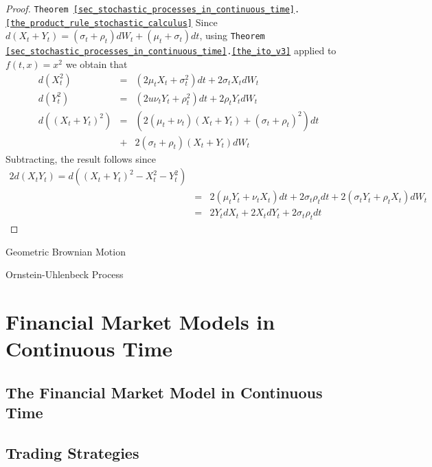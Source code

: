 \documentclass[11pt,a4paper]{article}
\begin{document}
  \begin{proof}{\texttt{Theorem \ref{sec_stochastic_processes_in_continuous_time}.\ref{the_product_rule_stochastic_calculus}}}
    Since $d(X_t+Y_t)=(\sigma_t+\rho_t)dW_t+(\mu_t+\sigma_t)dt$, using \texttt{Theorem \ref{sec_stochastic_processes_in_continuous_time}.\ref{the_ito_v3}} applied to $f(t,x)=x^2$ we obtain that
    \[\begin{array}{rcl}
      d(X_t^2)&=&(2\mu_tX_t+\sigma_t^2)dt+2\sigma_tX_tdW_t\\
      d(Y_t^2)&=&(2u\nu_tY_t+\rho_t^2)dt+2\rho_tY_tdW_t\\
      d((X_t+Y_t)^2)&=&(2(\mu_t+\nu_t)(X_t+Y_t)+(\sigma_t+\rho_t)^2)dt\\
      &+&2(\sigma_t+\rho_t)(X_t+Y_t)dW_t
    \end{array}\]
    Subtracting, the result follows since
    \[\begin{array}{rcl}
      2d(X_tY_t)=d((X_t+Y_t)^2-X_t^2-Y_t^2)\\
      &=&2(\mu_tY_t+\nu_tX_t)dt+2\sigma_t\rho_tdt+2(\sigma_tY_t+\rho_tX_t)dW_t\\
      &=&2Y_tdX_t+2X_tdY_t+2\sigma_t\rho_tdt
    \end{array}\]
  \end{proof}

  \begin{example}{Geometric Brownian Motion}
    
  \end{example}

  \begin{example}{Ornstein-Uhlenbeck Process}

  \end{example}

\section{Financial Market Models in Continuous Time} \label{sec_financial_market_models_in_continuous_time}

\subsection{The Financial Market Model in Continuous Time}

\subsection{Trading Strategies}
\end{document}
